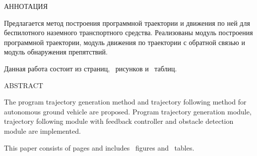 \begin{center}
	АННОТАЦИЯ
\end{center}

Предлагается метод построения программной траектории
и движения по ней для беспилотного наземного транспортного средства. Реализованы
модуль построения программной траектории, модуль движения по траектории с обратной
связью и модуль обнаружения препятствий.

Данная работа состоит из \pageref{LastPage} страниц, \totalfigures ~рисунков и
\totaltables ~таблиц. 

\begin{center}
	ABSTRACT
\end{center}

The program trajectory generation method and trajectory following method for
autonomous ground vehicle are proposed. Program trajectory generation module, 
trajectory following module with feedback controller and obstacle detection
module are implemented.

This paper consists of \pageref{LastPage} pages and includes \totalfigures ~figures and
\totaltables ~tables.
